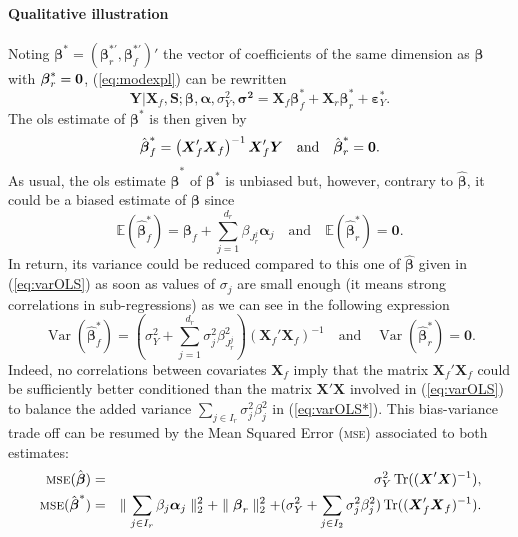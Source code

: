 \documentclass[11pt,a4paper]{article}
\begin{document}
\paragraph{Qualitative illustration} Noting $\boldsymbol{\beta}^*=(\boldsymbol{\beta}_r^{*'},\boldsymbol{\beta}_f^{*'})'$ the vector of coefficients of the same dimension as $\boldsymbol{\beta}$ with $\boldsymbol{\beta}_r^*={\bf 0}$, (\ref{eq:modexpl}) can be rewritten
\begin{equation}
	\boldsymbol{Y}{|\boldsymbol{X}_f,\boldsymbol{S}};\boldsymbol{\beta},\boldsymbol{\alpha},\sigma_Y^2,\boldsymbol{\sigma^2}=\boldsymbol{X}_f\boldsymbol{\beta}_f^*+\boldsymbol{X}_r\boldsymbol{\beta}_r^*+\boldsymbol{\varepsilon}_Y^*.\label{eq:modexpl2}
\end{equation}
The {\sc ols} estimate of $\boldsymbol{\beta}^*$ is then given by
	\begin{equation}
		\hat{\boldsymbol{\beta}}^*_f=\left(\boldsymbol{X}_f'\boldsymbol{X}_f \right) ^{-1}\boldsymbol{X}_f'\boldsymbol{Y} \quad \mbox{and} \quad \hat{\boldsymbol{\beta}}^*_r = {\bf 0}.
	\end{equation}
As usual, the {\sc ols} estimate $\hat{\boldsymbol{\beta}}^*$ of $\boldsymbol{\beta}^*$ is unbiased but, however, contrary to $\hat{\boldsymbol{\beta}}$, it could be a biased estimate of $\boldsymbol{\beta}$ since
		\begin{equation}
			\mathbb{E}(\hat{\boldsymbol{\beta}}_f^*)=\boldsymbol{\beta}_f+\sum_{j =1}^{d_r}\beta_{J_r^j}\boldsymbol{\alpha}_j \quad \textrm{and}\quad \mathbb{E}(\hat{\boldsymbol{\beta}}_r^*)=\boldsymbol{0}.
		\end{equation}
In return, its variance could be reduced compared to this one of $\hat{\boldsymbol{\beta}}$ given in (\ref{eq:varOLS}) as soon as values of $\sigma_j$ are small enough (it means strong correlations in sub-regressions) as we can see in the following expression
		\begin{equation}
			\operatorname{Var}(\hat{\boldsymbol{\beta}}_f^*)= (\sigma^2_Y+\sum_{j =1}^{d_r}\sigma^2_{j}\beta_{J_r^j}^2)(\boldsymbol{X}_f' \boldsymbol{X}_f)^{-1} \quad \textrm{and} \quad\operatorname{Var}(\hat{\boldsymbol{\beta}}_r^*)= \boldsymbol{0}. \label{eq:varOLS*}
		\end{equation}
Indeed, no correlations between covariates $\boldsymbol{X}_f$ imply that the matrix $\boldsymbol{X}_f' \boldsymbol{X}_f$ could be sufficiently better conditioned than the matrix $\boldsymbol{X}' \boldsymbol{X}$ involved in (\ref{eq:varOLS}) to balance the added variance $\sum_{j \in I_r}\sigma^2_{j}\beta_{j}^2$ in (\ref{eq:varOLS*}). This bias-variance trade off can be resumed by the Mean Squared Error (\textsc{mse}) associated to both estimates:
	\begin{eqnarray}
			\textsc{mse}(\hat{\boldsymbol{\beta}})&=& \sigma_Y^2 \operatorname{Tr}((\boldsymbol{X}'\boldsymbol{X})^{-1}),
			 \\
			\textsc{mse}(\hat{\boldsymbol{\beta}}^*)&=& \parallel\sum_{j \in I_r}\beta_{j}\boldsymbol{\alpha}_j \parallel_2^2 +\parallel \boldsymbol{\beta}_r\parallel^2_2 + (\sigma^2_Y+\sum_{j \in I_2}\sigma^2_{j}\beta_{j}^2 ) \operatorname{Tr}((\boldsymbol{X}_f' \boldsymbol{X}_f)^{-1}).
	\end{eqnarray}	 
\end{document}
